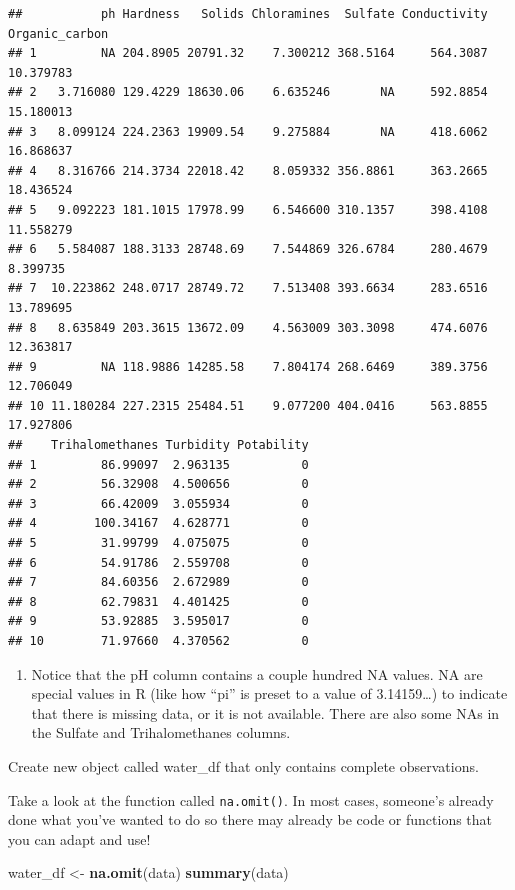 \documentclass[
]{book}
\newenvironment{Shaded}{\begin{snugshade}}{\end{snugshade}}
\newcommand{\FunctionTok}[1]{\textcolor[rgb]{0.13,0.29,0.53}{\textbf{#1}}}
\newcommand{\NormalTok}[1]{#1}
\newcommand{\OtherTok}[1]{\textcolor[rgb]{0.56,0.35,0.01}{#1}}
\providecommand{\tightlist}{%
  \setlength{\itemsep}{0pt}\setlength{\parskip}{0pt}}
\begin{document}
\begin{verbatim}
##           ph Hardness   Solids Chloramines  Sulfate Conductivity Organic_carbon
## 1         NA 204.8905 20791.32    7.300212 368.5164     564.3087      10.379783
## 2   3.716080 129.4229 18630.06    6.635246       NA     592.8854      15.180013
## 3   8.099124 224.2363 19909.54    9.275884       NA     418.6062      16.868637
## 4   8.316766 214.3734 22018.42    8.059332 356.8861     363.2665      18.436524
## 5   9.092223 181.1015 17978.99    6.546600 310.1357     398.4108      11.558279
## 6   5.584087 188.3133 28748.69    7.544869 326.6784     280.4679       8.399735
## 7  10.223862 248.0717 28749.72    7.513408 393.6634     283.6516      13.789695
## 8   8.635849 203.3615 13672.09    4.563009 303.3098     474.6076      12.363817
## 9         NA 118.9886 14285.58    7.804174 268.6469     389.3756      12.706049
## 10 11.180284 227.2315 25484.51    9.077200 404.0416     563.8855      17.927806
##    Trihalomethanes Turbidity Potability
## 1         86.99097  2.963135          0
## 2         56.32908  4.500656          0
## 3         66.42009  3.055934          0
## 4        100.34167  4.628771          0
## 5         31.99799  4.075075          0
## 6         54.91786  2.559708          0
## 7         84.60356  2.672989          0
## 8         62.79831  4.401425          0
## 9         53.92885  3.595017          0
## 10        71.97660  4.370562          0
\end{verbatim}

\begin{enumerate}
\def\labelenumi{\arabic{enumi}.}
\setcounter{enumi}{1}
\tightlist
\item
  Notice that the pH column contains a couple hundred NA values. NA are special values in R (like how ``pi'' is preset to a value of 3.14159\ldots) to indicate that there is missing data, or it is not available. There are also some NAs in the Sulfate and Trihalomethanes columns.
\end{enumerate}

Create new object called water\_df that only contains complete observations.

Take a look at the function called \texttt{na.omit()}. In most cases, someone's already done what you've wanted to do so there may already be code or functions that you can adapt and use!

\begin{Shaded}
\begin{Highlighting}[]
\NormalTok{water\_df }\OtherTok{\textless{}{-}} \FunctionTok{na.omit}\NormalTok{(data)}
\FunctionTok{summary}\NormalTok{(data)}
\end{Highlighting}
\end{Shaded}
\end{document}

